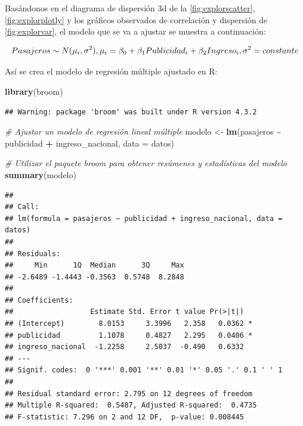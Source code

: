 \documentclass[
]{book}
\newenvironment{Shaded}{\begin{snugshade}}{\end{snugshade}}
\newcommand{\AttributeTok}[1]{\textcolor[rgb]{0.13,0.29,0.53}{#1}}
\newcommand{\CommentTok}[1]{\textcolor[rgb]{0.56,0.35,0.01}{\textit{#1}}}
\newcommand{\FunctionTok}[1]{\textcolor[rgb]{0.13,0.29,0.53}{\textbf{#1}}}
\newcommand{\NormalTok}[1]{#1}
\newcommand{\OtherTok}[1]{\textcolor[rgb]{0.56,0.35,0.01}{#1}}
\newcommand{\SpecialCharTok}[1]{\textcolor[rgb]{0.81,0.36,0.00}{\textbf{#1}}}
\begin{document}
Basándonos en el diagrama de dispersión 3d de la \ref{fig:explorscatter},\ref{fig:explorplotly} y los gráficos observados de correlación y dispersión de \ref{fig:explorvar}, el modelo que se va a ajustar se muestra a continuación:

\[
\begin{equation}
Pasajeros \sim N(\mu_{i},\sigma^{2}),\\
\mu_{i} = \beta_{0} + \beta_{1}Publicidad_{i} + \beta_{2}Ingreso_{i},\\
\sigma^{2} = constante
\end{equation}
\]

Así se crea el modelo de regresión múltiple ajustado en R:

\begin{Shaded}
\begin{Highlighting}[]
\FunctionTok{library}\NormalTok{(broom)}
\end{Highlighting}
\end{Shaded}

\begin{verbatim}
## Warning: package 'broom' was built under R version 4.3.2
\end{verbatim}

\begin{Shaded}
\begin{Highlighting}[]
\CommentTok{\# Ajustar un modelo de regresión lineal múltiple}
\NormalTok{modelo }\OtherTok{\textless{}{-}} \FunctionTok{lm}\NormalTok{(pasajeros }\SpecialCharTok{\textasciitilde{}}\NormalTok{ publicidad }\SpecialCharTok{+}\NormalTok{ ingreso\_nacional, }\AttributeTok{data =}\NormalTok{ datos)}

\CommentTok{\# Utilizar el paquete broom para obtener resúmenes y estadísticas del modelo}
\FunctionTok{summary}\NormalTok{(modelo)}
\end{Highlighting}
\end{Shaded}

\begin{verbatim}
## 
## Call:
## lm(formula = pasajeros ~ publicidad + ingreso_nacional, data = datos)
## 
## Residuals:
##     Min      1Q  Median      3Q     Max 
## -2.6489 -1.4443 -0.3563  0.5748  8.2848 
## 
## Coefficients:
##                  Estimate Std. Error t value Pr(>|t|)  
## (Intercept)        8.0153     3.3996   2.358   0.0362 *
## publicidad         1.1078     0.4827   2.295   0.0406 *
## ingreso_nacional  -1.2258     2.5037  -0.490   0.6332  
## ---
## Signif. codes:  0 '***' 0.001 '**' 0.01 '*' 0.05 '.' 0.1 ' ' 1
## 
## Residual standard error: 2.795 on 12 degrees of freedom
## Multiple R-squared:  0.5487, Adjusted R-squared:  0.4735 
## F-statistic: 7.296 on 2 and 12 DF,  p-value: 0.008445
\end{verbatim}
\end{document}

